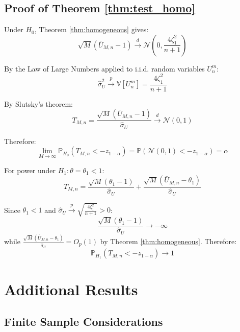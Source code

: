 \documentclass{article}
\theoremstyle{plain}
\theoremstyle{definition}
\theoremstyle{remark}
\begin{document}
\subsection{Proof of Theorem \ref{thm:test_homo}}

Under $H_0$, Theorem \ref{thm:homogeneous} gives:
\begin{equation}
    \sqrt{M}(\bar{U}_{M,n} - 1) \xrightarrow{d} \mathcal{N}\left(0, \frac{4\zeta_1^2}{n+1}\right)
\end{equation}

By the Law of Large Numbers applied to i.i.d. random variables $U_n^m$:
\begin{equation}
    \hat{\sigma}_U^2 \xrightarrow{p} \mathbb V[U_n^m] = \frac{4\zeta_1^2}{n+1}
\end{equation}

By Slutsky's theorem:
\begin{equation}
    T_{M,n} = \frac{\sqrt{M}(\bar{U}_{M,n} - 1)}{\hat{\sigma}_U} \xrightarrow{d} \mathcal{N}(0, 1)
\end{equation}

Therefore:
\begin{equation}
    \lim_{M \to \infty} \mathbb P_{H_0}(T_{M,n} < -z_{1-\alpha}) = \mathbb P(\mathcal{N}(0,1) < -z_{1-\alpha}) = \alpha
\end{equation}

For power under $H_1: \theta = \theta_1 < 1$:
\begin{equation}
    T_{M,n} = \frac{\sqrt{M}(\theta_1 - 1)}{\hat{\sigma}_U} + \frac{\sqrt{M}(\bar{U}_{M,n} - \theta_1)}{\hat{\sigma}_U}
\end{equation}

Since $\theta_1 < 1$ and $\hat{\sigma}_U \xrightarrow{p} \sqrt{\frac{4\zeta_1^2}{n+1}} > 0$:
\begin{equation}
    \frac{\sqrt{M}(\theta_1 - 1)}{\hat{\sigma}_U} \to -\infty
\end{equation}
while $\frac{\sqrt{M}(\bar{U}_{M,n} - \theta_1)}{\hat{\sigma}_U} = O_p(1)$ by Theorem \ref{thm:homogeneous}. Therefore:
\begin{equation}
    \mathbb P_{H_1}(T_{M,n} < -z_{1-\alpha}) \to 1
\end{equation}

\section{Additional Results}

\subsection{Finite Sample Considerations}
\end{document}
